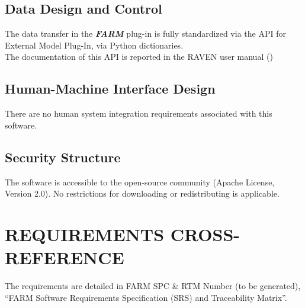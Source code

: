 \subsection{Data Design and Control}
The data transfer in the \textbf{\textit{FARM}}  plug-in is fully standardized via the API for 
External Model Plug-In, via Python dictionaries.
\\The documentation of this API is reported in the RAVEN user manual (\cite{RAVENuserManual})

\subsection{Human-Machine Interface Design} 
 There are no human system integration requirements associated with this software.

 \subsection{Security Structure} 
The software is accessible to the open-source community (Apache License, Version 2.0). 
No restrictions for downloading or redistributing is applicable.



 \section{REQUIREMENTS CROSS-REFERENCE} 
The requirements are detailed in FARM SPC \& RTM Number (to be generated), 
``FARM Software Requirements Specification (SRS) and Traceability Matrix''.
